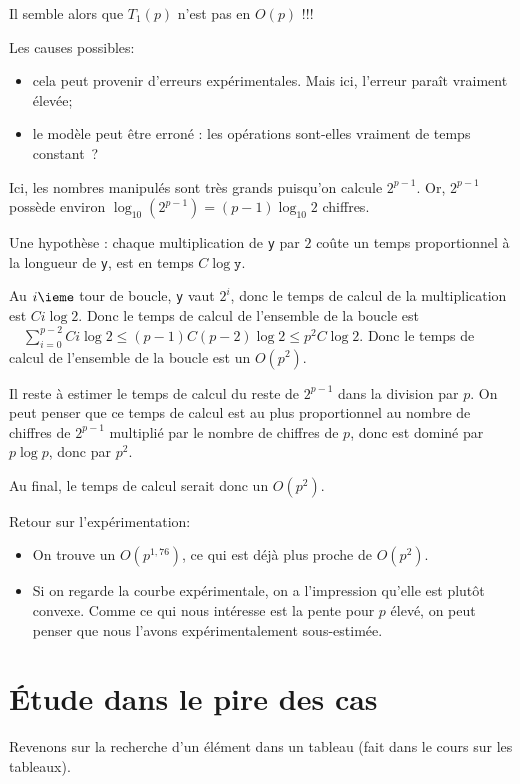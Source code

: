 Il semble alors que $T_1(p)$ n'est pas en $O(p)$ !!!

Les causes possibles:
\begin{itemize}
\item cela peut provenir d'erreurs expérimentales. Mais ici, l'erreur paraît vraiment 
élevée;
\item le modèle peut être erroné : les opérations sont-elles vraiment de temps constant~?
\end{itemize}




Ici, les nombres manipulés sont très grands puisqu'on calcule
$2^{p-1}$. Or, $2^{p-1}$ possède environ $\log_{10} (2^{p-1}) =
(p-1)\log_{10} 2$ chiffres.

Une hypothèse : chaque multiplication de \texttt{y} par $2$ coûte un temps proportionnel à la longueur de \texttt{y}, est en temps $C \log \texttt{y}$.

Au $i\ieme$ tour de boucle, \texttt{y} vaut $2^{i}$, donc le temps de
calcul de la multiplication est $C i \log 2$. Donc le temps de calcul
de l'ensemble de la boucle est $\quad   \sum_{i=0}^{p-2} C i \log 2 \leq (p-1) C (p-2)\log 2\leq p^{2}C\log 2$.
Donc le temps de calcul de l'ensemble de la boucle est un $O(p^{2})$.

Il reste à estimer le temps de calcul du reste de $2^{p-1}$ dans la
division par $p$. On peut penser que ce temps de calcul est au plus
proportionnel au nombre de chiffres de $2^{p-1}$ multiplié par le
nombre de chiffres de $p$, donc est dominé par $p\log p$, donc par
$p^{2}$.

Au final, le temps de calcul serait donc un $O(p^{2})$.

Retour sur l'expérimentation:
\begin{itemize}
\item On trouve un $O(p^{1,76})$, ce qui est déjà plus proche de $O(p^{2})$.
\item Si on regarde la courbe expérimentale, on a l'impression qu'elle
  est plutôt convexe. Comme ce qui nous intéresse est la pente pour
  $p$ élevé, on peut penser que nous l'avons expérimentalement sous-estimée.
\end{itemize}

\section{\'Etude dans le pire des cas}

Revenons sur la recherche d'un élément dans un tableau (fait dans le cours sur les tableaux). 


